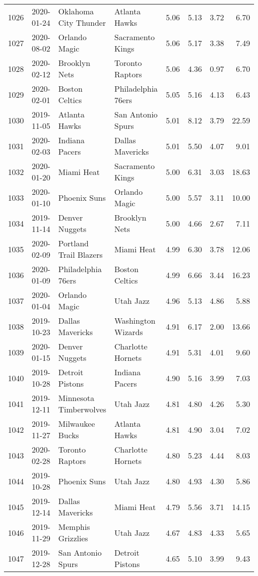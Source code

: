 \documentclass[
  11pt,
]{article}
\theoremstyle{nonumberplain}
\begin{document}
\begin{longtable}{rl|llr|rrr}
1026 & 2020-01-24 & Oklahoma City Thunder & Atlanta Hawks & 5.06 & 5.13 & 3.72 & 6.70\\
1027 & 2020-08-02 & Orlando Magic & Sacramento Kings & 5.06 & 5.17 & 3.38 & 7.49\\
1028 & 2020-02-12 & Brooklyn Nets & Toronto Raptors & 5.06 & 4.36 & 0.97 & 6.70\\
1029 & 2020-02-01 & Boston Celtics & Philadelphia 76ers & 5.05 & 5.16 & 4.13 & 6.43\\
1030 & 2019-11-05 & Atlanta Hawks & San Antonio Spurs & 5.01 & 8.12 & 3.79 & 22.59\\
1031 & 2020-02-03 & Indiana Pacers & Dallas Mavericks & 5.01 & 5.50 & 4.07 & 9.01\\
1032 & 2020-01-20 & Miami Heat & Sacramento Kings & 5.00 & 6.31 & 3.03 & 18.63\\
1033 & 2020-01-10 & Phoenix Suns & Orlando Magic & 5.00 & 5.57 & 3.11 & 10.00\\
1034 & 2019-11-14 & Denver Nuggets & Brooklyn Nets & 5.00 & 4.66 & 2.67 & 7.11\\
1035 & 2020-02-09 & Portland Trail Blazers & Miami Heat & 4.99 & 6.30 & 3.78 & 12.06\\
1036 & 2020-01-09 & Philadelphia 76ers & Boston Celtics & 4.99 & 6.66 & 3.44 & 16.23\\
1037 & 2020-01-04 & Orlando Magic & Utah Jazz & 4.96 & 5.13 & 4.86 & 5.88\\
1038 & 2019-10-23 & Dallas Mavericks & Washington Wizards & 4.91 & 6.17 & 2.00 & 13.66\\
1039 & 2020-01-15 & Denver Nuggets & Charlotte Hornets & 4.91 & 5.31 & 4.01 & 9.60\\
1040 & 2019-10-28 & Detroit Pistons & Indiana Pacers & 4.90 & 5.16 & 3.99 & 7.03\\
1041 & 2019-12-11 & Minnesota Timberwolves & Utah Jazz & 4.81 & 4.80 & 4.26 & 5.30\\
1042 & 2019-11-27 & Milwaukee Bucks & Atlanta Hawks & 4.81 & 4.90 & 3.04 & 7.02\\
1043 & 2020-02-28 & Toronto Raptors & Charlotte Hornets & 4.80 & 5.23 & 4.44 & 8.03\\
1044 & 2019-10-28 & Phoenix Suns & Utah Jazz & 4.80 & 4.93 & 4.30 & 5.86\\
1045 & 2019-12-14 & Dallas Mavericks & Miami Heat & 4.79 & 5.56 & 3.71 & 14.15\\
1046 & 2019-11-29 & Memphis Grizzlies & Utah Jazz & 4.67 & 4.83 & 4.33 & 5.65\\
1047 & 2019-12-28 & San Antonio Spurs & Detroit Pistons & 4.65 & 5.10 & 3.99 & 9.43\\

\end{longtable}
\end{document}
